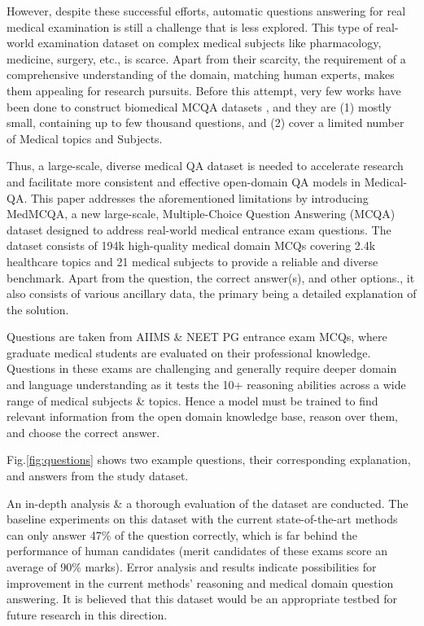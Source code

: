 \documentclass[pmlr,twocolumn,10pt]{jmlr}
\begin{document}
However, despite these successful efforts, automatic questions answering for real medical examination is still a challenge that is less explored. This type of real-world examination dataset on complex medical subjects like pharmacology, medicine, surgery, etc., is scarce. Apart from their scarcity, the requirement of a comprehensive understanding of the domain, matching human experts, makes them appealing for research pursuits.
Before this attempt, very few works have been done to construct biomedical MCQA datasets \citep{Vilares2019}, and they are (1) mostly small, containing up to few thousand questions, and (2) cover a limited number of Medical topics and Subjects.

Thus, a large-scale, diverse medical QA dataset is needed to accelerate research and facilitate more consistent and effective open-domain QA models in Medical-QA. This paper addresses the aforementioned limitations by introducing MedMCQA, a new large-scale, Multiple-Choice Question Answering (MCQA) dataset designed to address real-world medical entrance exam questions. The dataset consists of 194k high-quality medical domain MCQs covering 2.4k healthcare topics and 21 medical subjects to provide a reliable and diverse benchmark. Apart from the question, the correct answer(s), and other options., it also consists of various ancillary data, the primary being a detailed explanation of the solution.

Questions are taken from AIIMS \& NEET PG entrance exam MCQs, where graduate medical students are evaluated on their professional knowledge. Questions in these exams are challenging and generally require deeper domain and language understanding as it tests the 10+ reasoning abilities across a wide range of medical subjects \& topics. Hence a model must be trained to find relevant information from the open domain knowledge base, reason over them, and choose the correct answer.

Fig.\ref{fig:questions} shows two example questions, their corresponding explanation, and answers from the study dataset.

An in-depth analysis \& a thorough evaluation of the dataset are conducted. The baseline experiments on this dataset with the current state-of-the-art methods can only answer 47\% of the question correctly, which is far behind the performance of human candidates (merit candidates of these exams score an average of 90\% marks). Error analysis and results indicate possibilities for improvement in the current methods' reasoning and medical domain question answering. It is believed that this dataset would be an appropriate testbed for future research in this direction.
\end{document}
